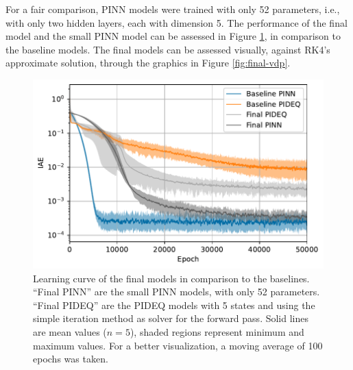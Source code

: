 For a fair comparison, \gls{PINN} models were trained with only 52 parameters, i.e., with only two hidden layers, each with dimension 5.
The performance of the final model and the small \gls{PINN} model can be assessed in Figure \ref{fig:final-iae}, in comparison to the baseline models. The final models can be assessed visually, against \gls{RK4}'s approximate solution, through the graphics in Figure \ref{fig:final-vdp}.

\begin{figure}[h]
    \centering
    \includegraphics{images/final_iae.pdf}
    \caption{Learning curve of the final models in comparison to the baselines. ``Final PINN'' are the small \gls{PINN} models, with only 52 parameters. ``Final PIDEQ'' are the \gls{PIDEQ} models with 5 states and using the simple iteration method as solver for the forward pass. Solid lines are mean values ($n=5$), shaded regions represent minimum and maximum values. For a better visualization, a moving average of 100 epochs was taken.}
    \label{fig:final-iae}
\end{figure}


